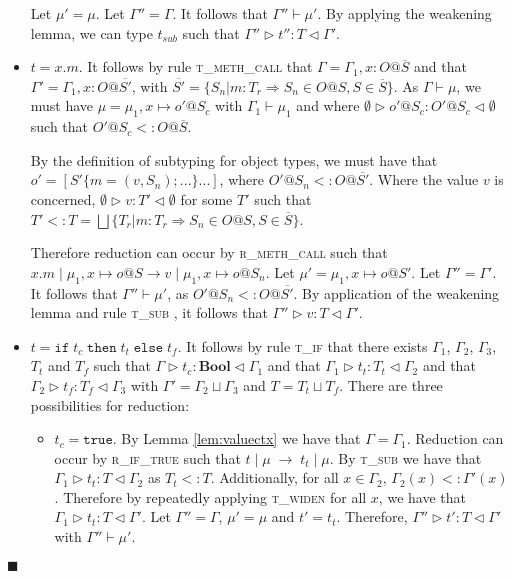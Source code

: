 \documentclass{article}
\newcommand{\lemref}[1]{Lemma \ref{#1}}
\newcommand{\rmethc}{\textsc{r\_meth\_call} }
\newcommand{\riftrue}{\textsc{r\_if\_true} }
\newcommand{\tif}{\textsc{t\_if} }
\newcommand{\tmethc}{\textsc{t\_meth\_call} }
\newcommand{\tsub}{\textsc{t\_sub} }
\newcommand{\twiden}{\textsc{t\_widen} }
\newcommand{\typerule}[4]{#1 \triangleright #2 : #3 \triangleleft #4}
\newcommand{\oprule}[4]{#1 \mid #2\;\longrightarrow\;#3 \mid #4}
\newcommand{\truev}{\mathtt{true}}
\newcommand{\boolt}{\mathbf{Bool}}
\newcommand{\ift}[3]{\mathtt{if} \; #1 \; \mathtt{then} \; #2 \; \mathtt{else} \; #3}
\newcommand{\qed}{$\blacksquare$}
\newenvironment{proof}{\vspace{1ex}\noindent{\bf Proof}\hspace{0.5em}}
  {\hfill\qed\vspace{1ex}}
\begin{document}
\begin{proof}
\begin{itemize}
Let $\mu' = \mu$. Let $\Gamma'' = \Gamma$. It follows that 
$\Gamma'' \vdash \mu'$. By applying the weakening lemma, we can type 
$t_{sub}$ such that $\typerule{\Gamma''}{t''}{T}{\Gamma'}$.

\item $t = x.m$. It follows by rule \tmethc that
$\Gamma = \Gamma_1, x : O@\overline{S}$ and that 
$\Gamma' = \Gamma_1, x : O@\overline{S'}$, with
$\overline{S'} = \{ S_n | m : T_r \Rightarrow S_n \in O@S, S \in \overline{S} \}$.
As
$\Gamma \vdash \mu$, we must have $\mu = \mu_1, x \mapsto o'@S_c$ with
$\Gamma_1 \vdash \mu_1$ and where
$\typerule{\emptyset}{o'@S_c}{O'@S_c}{\emptyset}$ such that
$O'@S_c <: O@\overline{S}$. 

By the definition of subtyping for object types,
we must have that
$o' = [ S' \{ m = (v,S_n) ; ... \} ... ]$, where $O'@S_n <: O@\overline{S'}$. 
Where the value $v$ is concerned, $\typerule{\emptyset}{v}{T'}{\emptyset}$
for some $T'$ such that $T' <: T = \bigsqcup{ \{ T_r | m : T_r \Rightarrow S_n \in O@S, S \in \overline{S} \} }$.

Therefore reduction can occur by \rmethc such that
$x.m \mid \mu_1, x \mapsto o@S \longrightarrow v \mid \mu_1, x \mapsto o@S_n$.
Let $\mu' = \mu_1, x \mapsto o@S'$. Let $\Gamma'' = \Gamma'$. It follows that
$\Gamma'' \vdash \mu'$, as $O'@S_n <: O@\overline{S'}$. 
By application of the weakening lemma and rule \tsub, it follows that
$\typerule{\Gamma''}{v}{T}{\Gamma'}$.

\item $t = \ift{t_c}{t_t}{t_f}$. It follows by rule \tif that there exists
$\Gamma_1$, $\Gamma_2$, $\Gamma_3$, $T_t$ and $T_f$ such that
$\typerule{\Gamma}{t_c}{\boolt}{\Gamma_1}$ and that
$\typerule{\Gamma_1}{t_t}{T_t}{\Gamma_2}$ and that
$\typerule{\Gamma_2}{t_f}{T_f}{\Gamma_3}$ with
$\Gamma' = \Gamma_2 \sqcup \Gamma_3$ and $T = T_t \sqcup T_f$. There are
three possibilities for reduction:

	\begin{itemize}
	\item $t_c = \truev$. By \lemref{lem:valuectx} we have that
	$\Gamma = \Gamma_1$. Reduction can occur by \riftrue such that
	$\oprule{t}{\mu}{t_t}{\mu}$. By \tsub we have that
	$\typerule{\Gamma_1}{t_t}{T}{\Gamma_2}$ as $T_t <: T$. Additionally, for
	all $x \in \Gamma_2$, $\Gamma_2(x) <: \Gamma'(x)$. Therefore by
	repeatedly applying \twiden for all $x$, we have that
	$\typerule{\Gamma_1}{t_t}{T}{\Gamma'}$.
	Let $\Gamma'' = \Gamma$, $\mu' = \mu$ and 
	$t' = t_t$. Therefore, $\typerule{\Gamma''}{t'}{T}{\Gamma'}$ with
	$\Gamma'' \vdash \mu'$.


\end{itemize}
\end{itemize}
\end{proof}
\end{document}
